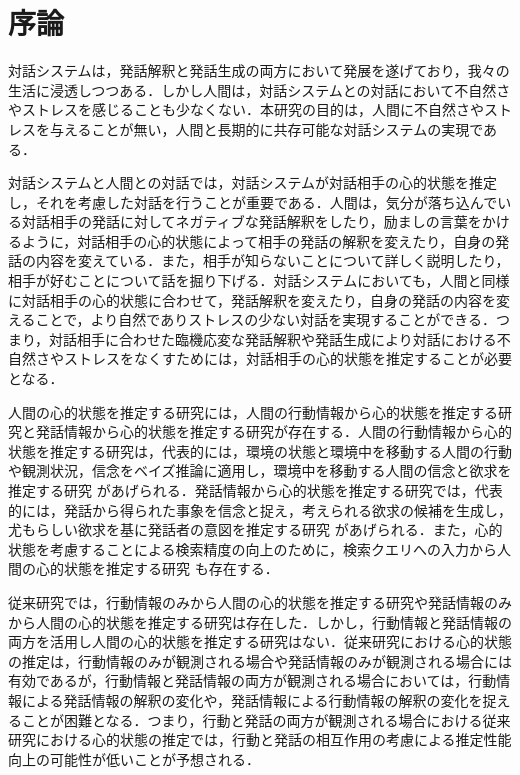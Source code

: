 \chapter{序論}

\par
対話システムは，発話解釈と発話生成の両方において発展を遂げており，我々の生活に浸透しつつある．しかし人間は，対話システムとの対話において不自然さやストレスを感じることも少なくない．本研究の目的は，人間に不自然さやストレスを与えることが無い，人間と長期的に共存可能な対話システムの実現である．

\par
対話システムと人間との対話では，対話システムが対話相手の心的状態を推定し，それを考慮した対話を行うことが重要である．人間は，気分が落ち込んでいる対話相手の発話に対してネガティブな発話解釈をしたり，励ましの言葉をかけるように，対話相手の心的状態によって相手の発話の解釈を変えたり，自身の発話の内容を変えている．また，相手が知らないことについて詳しく説明したり，相手が好むことについて話を掘り下げる．対話システムにおいても，人間と同様に対話相手の心的状態に合わせて，発話解釈を変えたり，自身の発話の内容を変えることで，より自然でありストレスの少ない対話を実現することができる．つまり，対話相手に合わせた臨機応変な発話解釈や発話生成により対話における不自然さやストレスをなくすためには，対話相手の心的状態を推定することが必要となる．

\par
人間の心的状態を推定する研究には，人間の行動情報から心的状態を推定する研究と発話情報から心的状態を推定する研究が存在する．人間の行動情報から心的状態を推定する研究は，代表的には，環境の状態と環境中を移動する人間の行動や観測状況，信念をベイズ推論に適用し，環境中を移動する人間の信念と欲求を推定する研究 \cite{baker2011bayesian}があげられる．発話情報から心的状態を推定する研究では，代表的には，発話から得られた事象を信念と捉え，考えられる欲求の候補を生成し，尤もらしい欲求を基に発話者の意図を推定する研究 \cite{高橋拓誠2015bdi}があげられる．また，心的状態を考慮することによる検索精度の向上のために，検索クエリへの入力から人間の心的状態を推定する研究 \cite{10.1007/978-3-642-02481-8_4}も存在する．

\par
従来研究では，行動情報のみから人間の心的状態を推定する研究や発話情報のみから人間の心的状態を推定する研究は存在した．しかし，行動情報と発話情報の両方を活用し人間の心的状態を推定する研究はない．従来研究における心的状態の推定は，行動情報のみが観測される場合や発話情報のみが観測される場合には有効であるが，行動情報と発話情報の両方が観測される場合においては，行動情報による発話情報の解釈の変化や，発話情報による行動情報の解釈の変化を捉えることが困難となる．つまり，行動と発話の両方が観測される場合における従来研究における心的状態の推定では，行動と発話の相互作用の考慮による推定性能向上の可能性が低いことが予想される．

